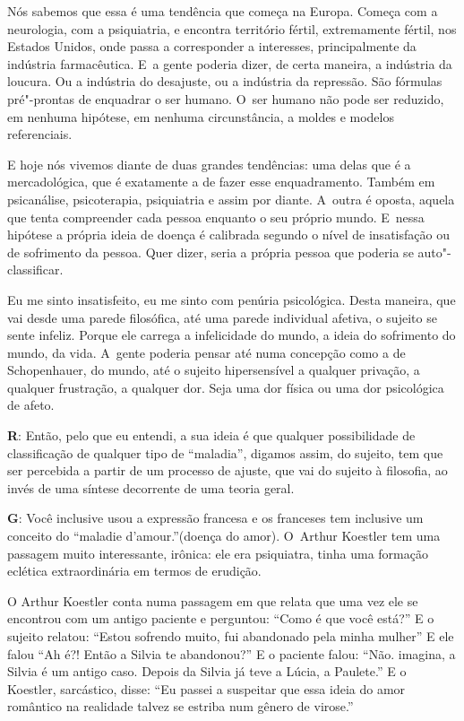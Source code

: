  

Nós sabemos que essa é uma tendência que começa na Europa. Começa com a
neurologia, com a psiquiatria, e encontra território fértil,
extremamente fértil, nos Estados Unidos, onde passa a corresponder a
interesses, principalmente da indústria farmacêutica. E~a gente poderia
dizer, de certa maneira, a indústria da loucura. Ou a indústria do
desajuste, ou a indústria da repressão. São fórmulas pré"-prontas de
enquadrar o ser humano. O~ser humano não pode ser reduzido, em nenhuma
hipótese, em nenhuma circunstância, a moldes e modelos referenciais.

 

E hoje nós vivemos diante de duas grandes tendências: uma delas que é a
mercadológica, que é exatamente a de fazer esse enquadramento. Também em
psicanálise, psicoterapia, psiquiatria e assim por diante. A~outra é
oposta, aquela que tenta compreender cada pessoa enquanto o seu próprio
mundo. E~nessa hipótese a própria ideia de doença é calibrada segundo o
nível de insatisfação ou de sofrimento da pessoa. Quer dizer, seria a
própria pessoa que poderia se auto"-classificar.

 

Eu me sinto insatisfeito, eu me sinto com penúria psicológica. Desta
maneira, que vai desde uma parede filosófica, até uma parede individual
afetiva, o sujeito se sente infeliz. Porque ele carrega a infelicidade
do mundo, a ideia do sofrimento do mundo, da vida. A~gente poderia
pensar até numa concepção como a de Schopenhauer, do mundo, até o
sujeito hipersensível a qualquer privação, a qualquer frustração, a
qualquer dor. Seja uma dor física ou uma dor psicológica de afeto.

 

\textbf{R}: Então, pelo que eu entendi, a sua ideia é que qualquer
possibilidade de classificação de qualquer tipo de ``maladia'', digamos
assim, do sujeito, tem que ser percebida a partir de um processo de
ajuste, que vai do sujeito à filosofia, ao invés de uma síntese
decorrente de uma teoria geral.

 

\textbf{G}: Você inclusive usou a expressão francesa e os franceses tem
inclusive um conceito do ``maladie d'amour.''(doença do amor). O~Arthur
Koestler tem uma passagem muito interessante, irônica: ele era
psiquiatra, tinha uma formação eclética extraordinária em termos de
erudição.

O Arthur Koestler conta numa passagem em que relata que uma vez ele se
encontrou com um antigo paciente e perguntou: ``Como é que você está?''
E o sujeito relatou: ``Estou sofrendo muito, fui abandonado pela minha
mulher'' E ele falou ``Ah é?! Então a Silvia te abandonou?'' E o paciente
falou: ``Não. imagina, a Silvia é um antigo caso. Depois da Silvia já
teve a Lúcia, a Paulete.'' E o Koestler, sarcástico, disse: ``Eu passei a
suspeitar que essa ideia do amor romântico na realidade talvez se
estriba num gênero de virose.''

